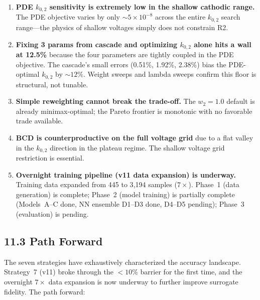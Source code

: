 \documentclass[11pt]{article}
\begin{document}
\begin{enumerate}
  \item \textbf{PDE $k_{0,2}$ sensitivity is extremely low in the shallow
        cathodic range.}  The PDE objective varies by only ${\sim}5 \times
        10^{-8}$ across the entire $k_{0,2}$ search range---the physics of
        shallow voltages simply does not constrain R2.

  \item \textbf{Fixing 3 params from cascade and optimizing $k_{0,2}$ alone
        hits a wall at 12.5\%} because the four parameters are tightly coupled
        in the PDE objective.  The cascade's small errors (0.51\%, 1.92\%,
        2.38\%) bias the PDE-optimal $k_{0,2}$ by ${\sim}12\%$.  Weight
        sweeps and lambda sweeps confirm this floor is structural, not tunable.

  \item \textbf{Simple reweighting cannot break the trade-off.}  The
        $w_2 = 1.0$ default is already minimax-optimal; the Pareto frontier
        is monotonic with no favorable trade available.

  \item \textbf{BCD is counterproductive on the full voltage grid} due to
        a flat valley in the $k_{0,2}$ direction in the plateau regime.
        The shallow voltage grid restriction is essential.

  \item \textbf{Overnight training pipeline (v11 data expansion) is underway.}
        Training data expanded from 445 to 3{,}194 samples ($7\times$).
        Phase~1 (data generation) is complete; Phase~2 (model training) is
        partially complete (Models~A--C done, NN ensemble D1--D3 done,
        D4--D5 pending); Phase~3 (evaluation) is pending.
\end{enumerate}

\subsection*{11.3 Path Forward}

The seven strategies have exhaustively characterized the accuracy landscape.
Strategy~7 (v11) broke through the $< 10\%$ barrier for the first time, and
the overnight $7\times$ data expansion is now underway to further improve
surrogate fidelity.  The path forward:
\end{document}
